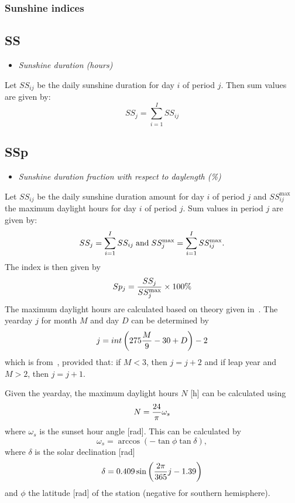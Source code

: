 \documentclass[a4paper,11pt]{article}
\begin{document}
\subsubsection{Sunshine indices}

\subsection*{SS}
\begin{itemize}
\item \textit{Sunshine duration (hours)}
\end{itemize}
Let $SS_{ij}$ be the daily sunshine duration for day $i$ of period
$j$. Then sum values are given by:
\begin{equation*}
SS_j = \sum_{i=1}^I{SS_{ij}}
\end{equation*}

\subsection*{SSp}
\begin{itemize}
\item \textit{Sunshine duration fraction with respect to daylength (\%)}
\end{itemize}
Let $SS_{ij}$ be the daily sunshine duration amount for day $i$ of period $j$ and $SS_{ij}^{\text{max}}$ the maximum daylight
hours for day $i$ of period $j$. Sum values in period $j$ are given by:
\begin{equation}
SS_j = \sum_{i=1}^I SS_{ij} \; \text{and} \;
SS_j^{\text{max}} = \sum_{i=1}^I SS_{ij}^{\text{max}}. \notag
\end{equation}
The index is then given by
\begin{equation}
Sp_j = {SS_j \over SS_j^{\text{max}}} \times 100\% \notag
\end{equation}
The maximum daylight hours are calculated based on theory given in~\cite{allen:94b}.
The yearday $j$ for month $M$ and day $D$ can be determined by
\begin{equation} \label{eq:c1}
j = int \left( 275 {M \over 9} - 30 + D \right) - 2
\end{equation}
which is from~\cite[eq. 1.26]{allen:94b}, provided that: if $M < 3$, then $j = j + 2$ and if leap year and $M > 2$, then
$j = j + 1$.

Given the yearday, the maximum daylight hours $N$ [h] can be calculated using~\cite[eq. 1.34]{allen:94b}
\begin{equation} \label{eq:c2}
N = {24 \over \pi} \omega_s
\end{equation}
where $\omega_s$ is the sunset hour angle [rad]. This can be calculated by~\cite[eq. 1.23]{allen:94b}
\begin{equation} \label{eq:c3}
\omega_s = \arccos \left( -\tan \phi \tan \delta \right),
\end{equation}
where $\delta$ is the solar declination [rad]~\cite[eq. 1.25]{allen:94b}
\begin{equation} \label{eq:c4}
\delta = 0.409 \sin \left( {2 \pi \over 365} j - 1.39 \right)
\end{equation}
and $\phi$ the latitude [rad] of the station (negative for southern hemisphere).
\end{document}
